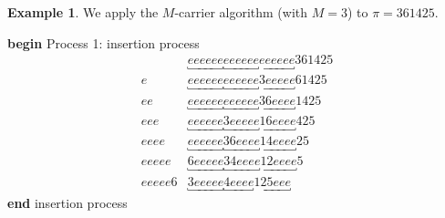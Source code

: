 \documentclass[submission]{FPSAC2021}
\theoremstyle{plain}
\theoremstyle{definition}
\newtheorem{example}[theorem]{Example}
\numberwithin{equation}{section}
\begin{document}
\begin{example}
We apply the $M$-carrier algorithm (with $M=3$) to $\pi = 361425.$
\begin{multicols}{2}
\begin{minipage}[H]{0.45\textwidth}
    \begin{center}
    \textbf{begin} Process 1: insertion process
    \vspace{-1em}
\begin{align*}
    &\underbracket{eeeeee}\underbracket{eeeeee}\underbracket{eeeeee}361425\\
    e&\underbracket{eeeeee}\underbracket{eeeeee}\underbracket{3eeeee}61425\\
    ee&\underbracket{eeeeee}\underbracket{eeeeee}\underbracket{36eeee}1425\\
    eee&\underbracket{eeeeee}\underbracket{3eeeee}\underbracket{16eeee}425\\
    eeee&\underbracket{eeeeee}\underbracket{36eeee}\underbracket{14eeee}25\\
    eeeee&\underbracket{6eeeee}\underbracket{34eeee}\underbracket{12eeee}5\\
    eeeee6&\underbracket{3eeeee}\underbracket{4eeee}\underbracket{125eee}
\end{align*}
            \textbf{end} insertion process 
            \end{center}
            \end{minipage}
            

\end{multicols}
\end{example}
\end{document}
